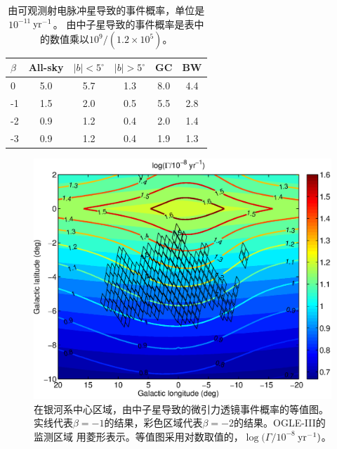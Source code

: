 \begin{table}
\begin{center}
\caption{由可观测射电脉冲星导致的事件概率，单位是$10^{-11}$\,$\rm{yr^{-1}}$。
由中子星导致的事件概率是表中的数值乘以$10^9/\left(1.2\times10^5\right)$。}
\label{eventRate}
\begin{tabular}{lccccc}
\hline
    $\beta$    &      All-sky  &   $\mid b\mid<5^{\circ}$  & $\mid b\mid>5^{\circ}$  & GC  &  BW        \\
\hline
      0        &      5.0      &    5.7    &  1.3  &  8.0 & 4.4   \\
      -1       &      1.5      &    2.0    &  0.5  &  5.5 & 2.8   \\
      -2       &      0.9      &    1.2    &  0.4  &  2.0 & 1.4   \\
      -3       &      0.9      &    1.2    &  0.4  &  1.9 & 1.3   \\
\hline
\end{tabular}
\end{center}
\end{table}
%
\begin{figure}
\begin{center}
\includegraphics[width=4 in,trim=0 0 0 3cm]{map_event_ns.eps}
\caption{在银河系中心区域，由中子星导致的微引力透镜事件概率的等值图。
实线代表$\beta=-1$的结果，彩色区域代表$\beta=-2$的结果。OGLE-III的监测区域
用菱形表示。等值图采用对数取值的，$\log(\Gamma/10^{-8}$\,$\rm{yr^{-1}})$。}
\label{map_event}
\end{center}
\end{figure}
%

